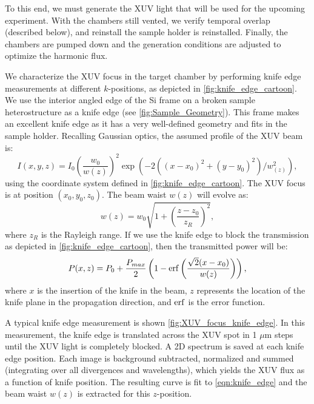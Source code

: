 To this end, we must generate the XUV light that will be used for the upcoming experiment. With the chambers still vented, we verify temporal overlap (described below), and reinstall the sample holder is reinstalled. Finally, the chambers are pumped down and the generation conditions are adjusted to optimize the harmonic flux.

We characterize the XUV focus in the target chamber by performing knife edge measurements at different $k$-positions, as depicted in \cref{fig:knife_edge_cartoon}. We use the interior angled edge of the Si frame on a broken sample heterostructure as a knife edge (see \cref{fig:Sample_Geometry}). This frame makes an excellent knife edge as it has a very well-defined geometry and fits in the sample holder. Recalling Gaussian optics, the assumed profile of the XUV beam is:
\begin{equation}
I(x,y,z) = I_0 \left( \frac{w_0}{w(z)} \right)^2 \exp \left( - 2 ((x-x_0)^2 + (y-y_0)^2) /  w_(z)^2 \right),
\end{equation}
using the coordinate system defined in \cref{fig:knife_edge_cartoon}. The XUV focus is at position $(x_0,y_0,z_0)$. The beam waist $w(z)$ will evolve as:
\begin{equation}
w(z) = w_0 \sqrt{ 1 + \left( \frac{z-z_0}{z_R} \right)^2 },
\label{eqn:beam_waist_evolution}
\end{equation}
where $z_R$ is the Rayleigh range. If we use the knife edge to block the transmission as depicted in \cref{fig:knife_edge_cartoon}, then the transmitted power will be:
\begin{equation}
P(x, z) = P_0 + \frac{P_{max}}{2} \left( 1 - \erf \left( \frac{\sqrt{2}(x-x_0)}{w(z)} \right) \right),
\label{eqn:knife_edge}
\end{equation}
where $x$ is the insertion of the knife in the beam, $z$ represents the location of the knife plane in the propagation direction, and $\erf$ is the error function.

A typical knife edge measurement is shown \cref{fig:XUV_focus_knife_edge}. In this measurement, the knife edge is translated across the XUV spot in 1 $\mu$m steps until the XUV light is completely blocked. A 2D spectrum is saved at each knife edge position. Each image is background subtracted, normalized and summed (integrating over all divergences and wavelengths), which yields the XUV flux as a function of knife position. The resulting curve is fit to \cref{eqn:knife_edge} and the beam waist $w(z)$ is extracted for this $z$-position.

